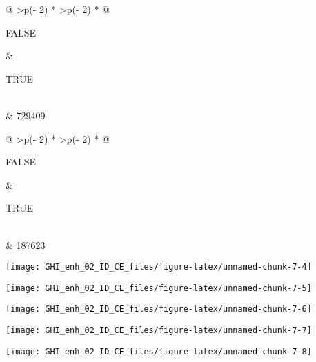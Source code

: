 \documentclass[
  10pt,
  a4paper,oneside]{article}
\begin{document}
\begin{longtable}[]{@{}
  >{\raggedleft\arraybackslash}p{(\columnwidth - 2\tabcolsep) * }
  >{\raggedleft\arraybackslash}p{(\columnwidth - 2\tabcolsep) * }@{}}
\toprule\noalign{}
\begin{minipage}[b]{\linewidth}\raggedleft
FALSE
\end{minipage} & \begin{minipage}[b]{\linewidth}\raggedleft
TRUE
\end{minipage} \\
\midrule\noalign{}
\endhead
\bottomrule\noalign{}
 & 729409 \\
\end{longtable}

\begin{longtable}[]{@{}
  >{\raggedleft\arraybackslash}p{(\columnwidth - 2\tabcolsep) * }
  >{\raggedleft\arraybackslash}p{(\columnwidth - 2\tabcolsep) * }@{}}
\toprule\noalign{}
\begin{minipage}[b]{\linewidth}\raggedleft
FALSE
\end{minipage} & \begin{minipage}[b]{\linewidth}\raggedleft
TRUE
\end{minipage} \\
\midrule\noalign{}
\endhead
\bottomrule\noalign{}
 & 187623 \\
\end{longtable}

\begin{center}\texttt{[image: GHI\_enh\_02\_ID\_CE\_files/figure-latex/unnamed-chunk-7-4]} \end{center}

\begin{center}\texttt{[image: GHI\_enh\_02\_ID\_CE\_files/figure-latex/unnamed-chunk-7-5]} \end{center}

\begin{center}\texttt{[image: GHI\_enh\_02\_ID\_CE\_files/figure-latex/unnamed-chunk-7-6]} \end{center}

\begin{center}\texttt{[image: GHI\_enh\_02\_ID\_CE\_files/figure-latex/unnamed-chunk-7-7]} \end{center}

\begin{center}\texttt{[image: GHI\_enh\_02\_ID\_CE\_files/figure-latex/unnamed-chunk-7-8]} \end{center}
\end{document}
